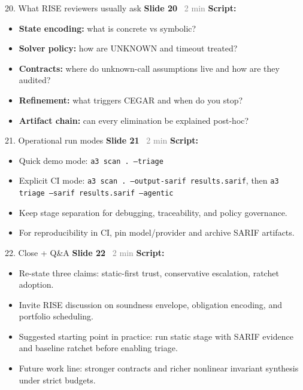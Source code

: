 \documentclass[aspectratio=169]{beamer}
\newcommand{\syncline}[2]{\textbf{#1} \hfill \textcolor{gray}{#2}}
\begin{document}
\begin{frame}{20. What RISE reviewers usually ask}
\syncline{Slide 20}{~2 min}
\textbf{Script:}
\begin{itemize}
  \item \textbf{State encoding:} what is concrete vs symbolic?
  \item \textbf{Solver policy:} how are UNKNOWN and timeout treated?
  \item \textbf{Contracts:} where do unknown-call assumptions live and how are they audited?
  \item \textbf{Refinement:} what triggers CEGAR and when do you stop?
  \item \textbf{Artifact chain:} can every elimination be explained post-hoc?
\end{itemize}
\end{frame}

\begin{frame}[fragile]{21. Operational run modes}
\syncline{Slide 21}{~2 min}
\textbf{Script:}
\begin{itemize}
  \item Quick demo mode: \texttt{a3 scan . --triage}
  \item Explicit CI mode: \texttt{a3 scan . --output-sarif results.sarif}, then \texttt{a3 triage --sarif results.sarif --agentic}
  \item Keep stage separation for debugging, traceability, and policy governance.
  \item For reproducibility in CI, pin model/provider and archive SARIF artifacts.
\end{itemize}
\end{frame}

\begin{frame}{22. Close + Q\&A}
\syncline{Slide 22}{~2 min}
\textbf{Script:}
\begin{itemize}
  \item Re-state three claims: static-first trust, conservative escalation, ratchet adoption.
  \item Invite RISE discussion on soundness envelope, obligation encoding, and portfolio scheduling.
  \item Suggested starting point in practice: run static stage with SARIF evidence and baseline ratchet before enabling triage.
  \item Future work line: stronger contracts and richer nonlinear invariant synthesis under strict budgets.
\end{itemize}
\end{frame}
\end{document}
